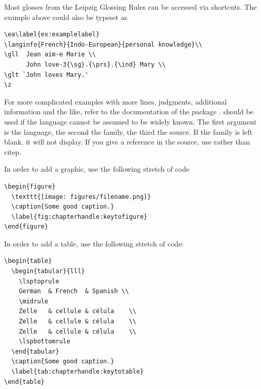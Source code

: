 Most glosses from the Leipzig Glossing Rules can be accessed via shortcuts. The example above could also be typeset as

\begin{verbatim}
\ea\label{ex:examplelabel}
\langinfo{French}{Indo-European}{personal knowledge}\\
\gll  Jean aim-e Marie \\
      John love-3{\sg}.{\prs}.{\ind} Mary \\
\glt `John loves Mary.'    
\z
\end{verbatim}

For more complicated examples with more lines, judgments, additional information and the like, refer to the documentation of the package .
 should be used if the language cannot be assumed to be widely known. The first argument is the language, the second the family, the third the source. If the family is left blank, it will not display. If you give a reference in the source, use  rather than {{\bs}citep}.

In order to add a graphic, use the following stretch of code

\begin{verbatim}
\begin{figure}
  \texttt{[image: figures/filename.png]}
  \caption{Some good caption.}
  \label{fig:chapterhandle:keytofigure}
\end{figure}
\end{verbatim}

In order to add a table, use the following stretch of code:

\begin{verbatim}
\begin{table} 
  \begin{tabular}{lll}
    \lsptoprule
    German  & French  & Spanish \\
    \midrule
    Zelle   & cellule & célula    \\
    Zelle   & cellule & célula    \\
    Zelle   & cellule & célula    \\
    \lspbottomrule
  \end{tabular}
  \caption{Some good caption.}
  \label{tab:chapterhandle:keytotable}
\end{table}
\end{verbatim}

